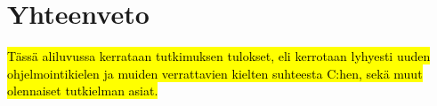 \section{Yhteenveto}

\hl{Tässä aliluvussa kerrataan tutkimuksen tulokset, eli kerrotaan lyhyesti
uuden ohjelmointikielen ja muiden verrattavien kielten suhteesta C:hen, sekä
muut olennaiset tutkielman asiat.}
